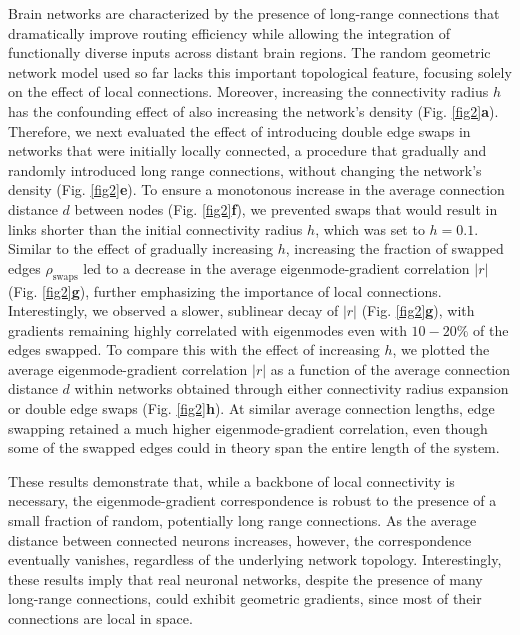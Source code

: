 \documentclass{article}
\begin{document}
Brain networks are characterized by the presence of long-range connections that dramatically improve routing efficiency while allowing the integration of functionally diverse inputs across distant brain regions\cite{betzel2018specificity}. The random geometric network model used so far lacks this important topological feature, focusing solely on the effect of local connections. Moreover, increasing the connectivity radius $h$ has the confounding effect of also increasing the network's density (Fig. \ref{fig2}\textbf{a}). Therefore, we next evaluated the effect of introducing double edge swaps in networks that were initially locally connected, a procedure that gradually and randomly introduced long range connections, without changing the network's density (Fig. \ref{fig2}\textbf{e}). To ensure a monotonous increase in the average connection distance $d$ between nodes (Fig. \ref{fig2}\textbf{f}), we prevented swaps that would result in links shorter than the initial connectivity radius $h$, which was set to $h=0.1$. Similar to the effect of gradually increasing $h$, increasing the fraction of swapped edges $\rho_{\text{swaps}}$ led to a decrease in the average eigenmode-gradient correlation $|r|$ (Fig. \ref{fig2}\textbf{g}), further emphasizing the importance of local connections. Interestingly, we observed a slower, sublinear decay of $|r|$ (Fig. \ref{fig2}\textbf{g}), with gradients remaining highly correlated with eigenmodes even with $10-20\%$ of the edges swapped. To compare this with the effect of increasing $h$, we plotted the average eigenmode-gradient correlation $|r|$ as a function of the average connection distance $d$ within networks obtained through either connectivity radius expansion or double edge swaps (Fig. \ref{fig2}\textbf{h}). At similar average connection lengths, edge swapping retained a much higher eigenmode-gradient correlation, even though some of the swapped edges could in theory span the entire length of the system. 

These results demonstrate that, while a backbone of local connectivity is necessary, the eigenmode-gradient correspondence is robust to the presence of a small fraction of random, potentially long range connections. As the average distance between connected neurons increases, however, the correspondence eventually vanishes, regardless of the underlying network topology. Interestingly, these results imply that real neuronal networks, despite the presence of many long-range connections, could exhibit geometric gradients, since most of their connections are local in space\cite{ercsey2013predictive}.
\end{document}
